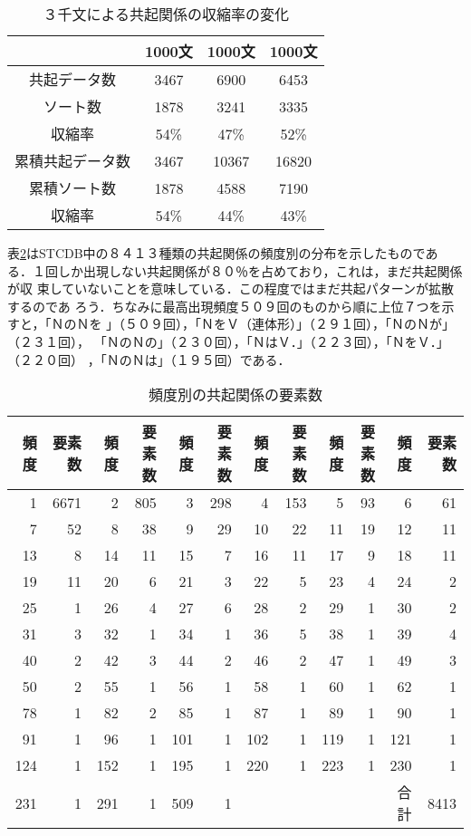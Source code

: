 \begin{table}[htb] \caption{３千文による共起関係の収縮率の変化}
\label{3000sent}
\begin{center}
\begin{tabular}{|c|c|c|c|}  
\hline
&1000文&1000文&1000文\\ \hline
共起データ数&3467&6900&6453\\
ソート数&1878&3241&3335\\
収縮率&54\%&47\%&52\%\\ \hline
累積共起データ数&3467&10367&16820\\
累積ソート数&1878&4588&7190\\
収縮率&54\%&44\%&43\%\\ \hline
\end{tabular}
\end{center}
\end{table}

表\ref{freq}はSTCDB中の８４１３種類の共起関係の頻度別の分布を示したものであ
る．１回しか出現しない共起関係が８０％を占めており，これは，まだ共起関係が収
束していないことを意味している．この程度ではまだ共起パターンが拡散するのであ
ろう．ちなみに最高出現頻度５０９回のものから順に上位７つを示すと，「ＮのＮを
」（５０９回），「ＮをＶ（連体形）」（２９１回），「ＮのＮが」（２３１回），
「ＮのＮの」（２３０回），「ＮはＶ．」（２２３回），「ＮをＶ．」（２２０回）
，「ＮのＮは」（１９５回）である．

\begin{table}[htb] \caption{頻度別の共起関係の要素数}
\label{freq}
\begin{center}
\begin{tabular}{|r|r||r|r||r|r||r|r||r|r||r|r|} \hline   
頻度 &要素数&頻度 &要素数&頻度 &要素数&頻度 &要素数&頻度 &要素数&頻度
&要素数\\ \hline \hline
1&6671&2&805&3&298&4&153&5&93&6&61\\ \hline
7&52&8&38&9&29&10&22&11&19&12&11\\ \hline
13&8&14&11&15&7&16&11&17&9&18&11\\ \hline
19&11&20&6&21&3&22&5&23&4&24&2\\ \hline
25&1&26&4&27&6&28&2&29&1&30&2\\ \hline
31&3&32&1&34&1&36&5&38&1&39&4\\ \hline
40&2&42&3&44&2&46&2&47&1&49&3\\ \hline
50&2&55&1&56&1&58&1&60&1&62&1\\ \hline
78&1&82&2&85&1&87&1&89&1&90&1\\ \hline
91&1&96&1&101&1&102&1&119&1&121&1\\ \hline
124&1&152&1&195&1&220&1&223&1&230&1\\ \hline
231&1&291&1&509&1&&&&&合計&8413\\ \hline
\end{tabular}
\end{center}
\end{table}


